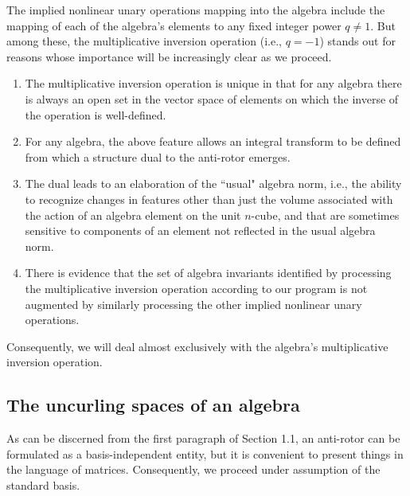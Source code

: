 \documentclass{amsart}
\numberwithin{equation}{section}
\theoremstyle{definition}
\numberwithin{theorem}{section}
\begin{document}
The implied nonlinear unary operations mapping into the algebra include the mapping of each of the algebra's elements to any fixed integer power $q\ne 1$.  But among these, the multiplicative inversion operation (i.e., $q=-1$)  stands out for reasons whose importance will be increasingly clear as we proceed.   \begin{enumerate}\item The multiplicative inversion operation is unique in that for any algebra there is always an open set in the vector space of elements on which the inverse of the operation is well-defined.   
\item For any algebra, the above feature allows an integral transform to be defined from which a structure dual to the anti-rotor emerges. \item The dual leads to an elaboration of the ``usual" algebra norm, i.e., the ability to recognize changes in features other than just the volume associated with the action of an algebra element on the unit $n$-cube, and that are sometimes sensitive to components of an element not reflected in the usual algebra norm.
\item There is evidence that the set of algebra invariants identified by processing the multiplicative inversion operation according to our program is not augmented by similarly processing the other implied nonlinear unary operations.
\end{enumerate} 

Consequently, we will deal almost exclusively with the algebra's multiplicative inversion operation.
 
      \subsection{The uncurling spaces of an algebra} As can be discerned from the first paragraph of Section 1.1, an anti-rotor can be formulated as a basis-independent entity, but it is convenient to present things in the language of matrices.  Consequently, we proceed under assumption of the standard basis.     
       
\end{document}
